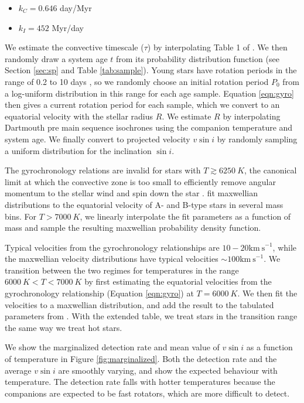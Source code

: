 \documentclass{emulateapj}
\begin{document}
\begin{itemize}
\item $k_C = 0.646$ day/Myr
\item $k_I = 452$ Myr/day
\end{itemize}
We estimate the convective timescale ($\tau$) by interpolating Table 1 of \citet{Barnes2010a}. We then randomly draw a system age $t$ from its probability distribution function (see Section \ref{sec:sp} and Table \ref{tab:sample}). Young stars have rotation periods in the range of 0.2 to 10 days \citep{Bouvier2014}, so we randomly choose an initial rotation period $P_0$ from a log-uniform distribution in this range for each age sample. Equation \ref{eqn:gyro} then gives a current rotation period for each sample, which we convert to an equatorial velocity with the stellar radius $R$. We estimate $R$ by interpolating Dartmouth pre main sequence isochrones \citep{Dotter2008} using the companion temperature and system age. We finally convert to projected velocity $v\sin{i}$ by randomly sampling a uniform distribution for the inclination $\sin{i}$.

The gyrochronology relations are invalid for stars with $T \gtrsim 6250\ K$, the canonical limit at which the convective zone is too small to efficiently remove angular momentum to the stellar wind and spin down the star \citep{Pinsonneault2001}. \citet{Zorec2012} fit maxwellian distributions to the equatorial velocity of A- and B-type stars in several mass bins. For $T > 7000\ K$, we linearly interpolate the fit parameters as a function of mass and sample the resulting maxwellian probability density function. 

Typical velocities from the gyrochronology relationships are $10-20 \mathrm{km\ s}^{-1}$, while the maxwellian velocity distributions have typical velocities $\sim 100 \mathrm{km\ s}^{-1}$. We transition between the two regimes for temperatures in the range $6000\ K < T < 7000\ K$ by first estimating the equatorial velocities from the gyrochronology relationship (Equation \ref{eqn:gyro}) at $T=6000\ K$. We then fit the velocities to a maxwellian distribution, and add the result to the tabulated parameters from \citep{Zorec2012}. With the extended table, we treat stars in the transition range the same way we treat hot stars.
 
We show the marginalized detection rate and mean value of $v\sin{i}$ as a function of temperature in Figure \ref{fig:marginalized}. Both the detection rate and the average $v\sin{i}$ are smoothly varying, and show the expected behaviour with temperature. The detection rate falls with hotter temperatures because the companions are expected to be fast rotators, which are more difficult to detect. 
\end{document}
